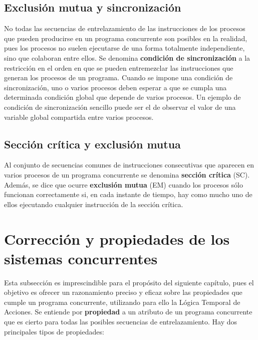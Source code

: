 \subsection{Exclusión mutua y sincronización}\label{subsec:concurrentexclusion}
No todas las secuencias de entrelazamiento de las instrucciones de los procesos que pueden producirse en un programa concurrente son posibles en la realidad, pues los procesos no suelen ejecutarse de una forma totalmente independiente, sino que colaboran entre ellos. Se denomina \textbf{condición de sincronización} a la restricción en el orden en que se pueden entremezclar las instrucciones que generan los procesos de un programa. Cuando se impone una condición de sincronización, uno o varios procesos deben esperar a que se cumpla una determinada condición global que depende de varios procesos. Un ejemplo de condición de sincronización sencillo puede ser el de observar el valor de una variable global compartida entre varios procesos.

\subsection{Sección crítica y exclusión mutua}\label{subsubsec:concurrentsc}
Al conjunto de secuencias comunes de instrucciones consecutivas que aparecen en varios procesos de un programa concurrente se denomina \textbf{sección crítica} (SC). Además, se dice que ocurre \textbf{exclusión mutua} (EM) cuando los procesos sólo funcionan correctamente si, en cada instante de tiempo, hay como mucho uno de ellos ejecutando cualquier instrucción de la sección crítica.

\section{Corrección y propiedades de los sistemas concurrentes}\label{subsec:concurrentproperties}
Esta subsección es imprescindible para el propósito del siguiente capítulo, pues el objetivo es ofrecer un razonamiento preciso y eficaz sobre las propiedades que cumple un programa concurrente, utilizando para ello la Lógica Temporal de Acciones. Se entiende por \textbf{propiedad} a un atributo de un programa concurrente que es cierto para todas las posibles secuencias de entrelazamiento. Hay dos principales tipos de propiedades:

